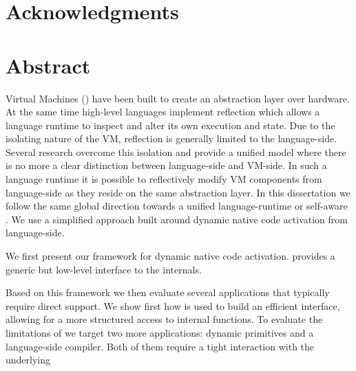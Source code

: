 \documentclass[a4paper,11pt,twoside]{include/ThesisStyle}
\begin{document}


\dominitoc

\cleardoublepage
\chapter*{Acknowledgments}


\cleardoublepage
\chapter*{Abstract}
% 
%
%
Virtual Machines (\VMs) have been built to create an abstraction layer over hardware.
At the same time high-level languages implement reflection which allows a language runtime to inspect and alter its own execution and state.
Due to the isolating nature of the VM, reflection is generally limited to the language-side.
Several research \VMs overcome this isolation and provide a unified model where there is no more a clear distinction between language-side and VM-side.
In such a language runtime it is possible to reflectively modify VM components from language-side as they reside on the same abstraction layer.
In this dissertation we follow the same global direction towards a unified language-runtime or self-aware \VM.
We use a simplified approach built around dynamic native code activation from language-side.

We first present \B our framework for dynamic native code activation.
\B provides a generic but low-level interface to the \VM internals.

Based on this framework we then evaluate several applications that typically require direct \VM support.
We show first how \B is used to build an efficient \FFI interface, allowing for a more structured access to \VM internal functions.
To evaluate the limitations of \B we target two more applications: dynamic primitives and a language-side \JIT compiler.
Both of them require a tight interaction with the underlying \VM
\end{document}
